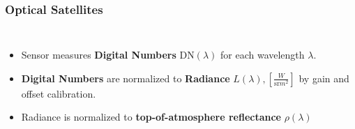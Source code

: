 
\begin{frame}
\frametitle{Optical Satellites}
\begin{columns}
	
	
	\begin{itemize}[itemsep=.5em]
		\item<1-> Sensor measures \textbf{Digital Numbers} $\text{DN}(\lambda)$ for each wavelength $\lambda$. 
		\item<2-> \textbf{Digital Numbers} are normalized to \textbf{Radiance} 
		$L(\lambda), \left[\frac{W}{\text{sr}m^2}\right]$ by gain and offset calibration.
		\item<3-> Radiance is normalized to \textbf{top-of-atmosphere reflectance} $\rho(\lambda)$
	\end{itemize}
	
	
	
	
	
\end{columns}
\end{frame}
